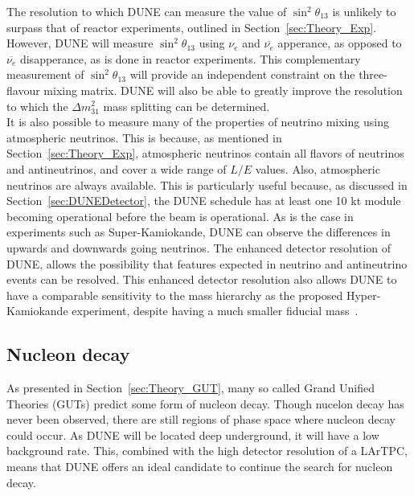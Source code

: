 The resolution to which DUNE can measure the value of $\sin^{2}\theta_{13}$ is unlikely to surpass that of reactor experiments, outlined in Section~\ref{sec:Theory_Exp}. However, DUNE will measure $\sin^{2}\theta_{13}$ using $\nu_e$ and $\overline{\nu_e}$ apperance, as opposed to $\overline{\nu_e}$ disapperance, as is done in reactor experiments. This complementary measurement of $\sin^{2}\theta_{13}$ will provide an independent constraint on the three-flavour mixing matrix. DUNE will also be able to greatly improve the resolution to which the $\Delta m^{2}_{31}$ mass splitting can be determined. \\

It is also possible to measure many of the properties of neutrino mixing using atmospheric neutrinos. This is because, as mentioned in Section~\ref{sec:Theory_Exp}, atmospheric neutrinos contain all flavors of neutrinos and antineutrinos, and cover a wide range of $L/E$ values. Also, atmospheric neutrinos are always available. This is particularly useful because, as discussed in Section~\ref{sec:DUNEDetector}, the DUNE schedule has at least one 10 kt module becoming operational before the beam is operational. As is the case in experiments such as Super-Kamiokande, DUNE can observe the differences in upwards and downwards going neutrinos. The enhanced detector resolution of DUNE, allows the possibility that features expected in neutrino and antineutrino events can be resolved. This enhanced detector resolution also allows DUNE to have a comparable sensitivity to the mass hierarchy as the proposed Hyper-Kamiokande experiment, despite having a much smaller fiducial mass~\citep{DUNECDR_V2}.  

\subsection{Nucleon decay} \label{sec:DUNE_NDK}%
As presented in Section~\ref{sec:Theory_GUT}, many so called Grand Unified Theories (GUTs) predict some form of nucleon decay. Though nucelon decay has never been observed, there are still regions of phase space where nucleon decay could occur. As DUNE will be located deep underground, it will have a low background rate. This, combined with the high detector resolution of a LArTPC, means that DUNE offers an ideal candidate to continue the search for nucleon decay. \\

